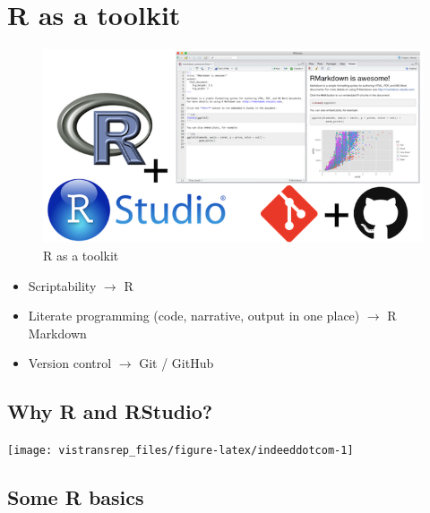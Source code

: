 \documentclass[]{book}
\providecommand{\tightlist}{%
  \setlength{\itemsep}{0pt}\setlength{\parskip}{0pt}}
\begin{document}
\hypertarget{r-as-a-toolkit}{%
\section{R as a toolkit}\label{r-as-a-toolkit}}

\begin{figure}
\centering
\includegraphics{img/toolkit.png}
\caption{R as a toolkit}
\end{figure}

\begin{itemize}
\tightlist
\item
  Scriptability \(\rightarrow\) R
\item
  Literate programming (code, narrative, output in one place) \(\rightarrow\) R Markdown
\item
  Version control \(\rightarrow\) Git / GitHub
\end{itemize}

\hypertarget{why-r-and-rstudio}{%
\subsection{Why R and RStudio?}\label{why-r-and-rstudio}}

\begin{flushright}\texttt{[image: vistransrep\_files/figure-latex/indeeddotcom-1]} \end{flushright}

\hypertarget{some-r-basics}{%
\subsection{Some R basics}\label{some-r-basics}}
\end{document}
